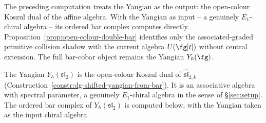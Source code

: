The preceding computation treats the Yangian as the output:
the open-colour Koszul dual of the affine algebra. With the
Yangian as input -- a genuinely $E_1$-chiral algebra -- its
ordered bar complex computes directly.  Proposition~\ref{prop:open-colour-double-bar}
identifies only the associated-graded primitive collision shadow with
the current algebra \(U(\fg[t])\) without central extension.  The full
bar-cobar object remains the Yangian \(Y_\hbar(\fg)\).

\begin{computation}%
\label{comp:yangian-e1-shadow}%
%
%
%
%
The Yangian $Y_\hbar(\mathfrak{sl}_2)$ is the open-colour
Koszul dual of $\widehat{\mathfrak{sl}}_{2,k}$
(Construction~\ref{constr:dg-shifted-yangian-from-bar}).
It is an associative algebra with spectral parameter, a genuinely
$E_1$-chiral algebra in the sense of \S\ref{sec:setup}. The
ordered bar complex of $Y_\hbar(\mathfrak{sl}_2)$ is computed
below, with the Yangian taken as the input chiral algebra.


\end{computation}
